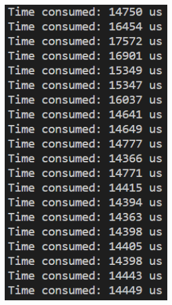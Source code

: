 \documentclass[a4paper,12pt]{article}
\begin{document}
\begin{figure}[H]
{\begin{minipage}[t]{0.4\textwidth}
        \includegraphics[width = 0.65\textwidth]{Optimized C++ 4sum.png}
    \end{minipage}}
\end{figure}
\end{document}
